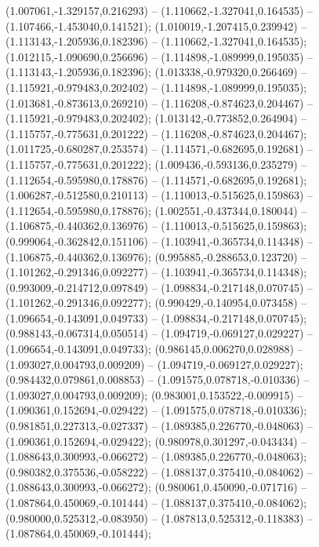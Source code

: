  (1.007061,-1.329157,0.216293) -- (1.110662,-1.327041,0.164535) -- (1.107466,-1.453040,0.141521);
 (1.010019,-1.207415,0.239942) -- (1.113143,-1.205936,0.182396) -- (1.110662,-1.327041,0.164535);
 (1.012115,-1.090690,0.256696) -- (1.114898,-1.089999,0.195035) -- (1.113143,-1.205936,0.182396);
 (1.013338,-0.979320,0.266469) -- (1.115921,-0.979483,0.202402) -- (1.114898,-1.089999,0.195035);
 (1.013681,-0.873613,0.269210) -- (1.116208,-0.874623,0.204467) -- (1.115921,-0.979483,0.202402);
 (1.013142,-0.773852,0.264904) -- (1.115757,-0.775631,0.201222) -- (1.116208,-0.874623,0.204467);
 (1.011725,-0.680287,0.253574) -- (1.114571,-0.682695,0.192681) -- (1.115757,-0.775631,0.201222);
 (1.009436,-0.593136,0.235279) -- (1.112654,-0.595980,0.178876) -- (1.114571,-0.682695,0.192681);
 (1.006287,-0.512580,0.210113) -- (1.110013,-0.515625,0.159863) -- (1.112654,-0.595980,0.178876);
 (1.002551,-0.437344,0.180044) -- (1.106875,-0.440362,0.136976) -- (1.110013,-0.515625,0.159863);
 (0.999064,-0.362842,0.151106) -- (1.103941,-0.365734,0.114348) -- (1.106875,-0.440362,0.136976);
 (0.995885,-0.288653,0.123720) -- (1.101262,-0.291346,0.092277) -- (1.103941,-0.365734,0.114348);
 (0.993009,-0.214712,0.097849) -- (1.098834,-0.217148,0.070745) -- (1.101262,-0.291346,0.092277);
 (0.990429,-0.140954,0.073458) -- (1.096654,-0.143091,0.049733) -- (1.098834,-0.217148,0.070745);
 (0.988143,-0.067314,0.050514) -- (1.094719,-0.069127,0.029227) -- (1.096654,-0.143091,0.049733);
 (0.986145,0.006270,0.028988) -- (1.093027,0.004793,0.009209) -- (1.094719,-0.069127,0.029227);
 (0.984432,0.079861,0.008853) -- (1.091575,0.078718,-0.010336) -- (1.093027,0.004793,0.009209);
 (0.983001,0.153522,-0.009915) -- (1.090361,0.152694,-0.029422) -- (1.091575,0.078718,-0.010336);
 (0.981851,0.227313,-0.027337) -- (1.089385,0.226770,-0.048063) -- (1.090361,0.152694,-0.029422);
 (0.980978,0.301297,-0.043434) -- (1.088643,0.300993,-0.066272) -- (1.089385,0.226770,-0.048063);
 (0.980382,0.375536,-0.058222) -- (1.088137,0.375410,-0.084062) -- (1.088643,0.300993,-0.066272);
 (0.980061,0.450090,-0.071716) -- (1.087864,0.450069,-0.101444) -- (1.088137,0.375410,-0.084062);
 (0.980000,0.525312,-0.083950) -- (1.087813,0.525312,-0.118383) -- (1.087864,0.450069,-0.101444);
